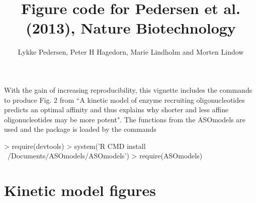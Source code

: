 \documentclass{article}
\title{Figure code for Pedersen et al. (2013), Nature Biotechnology}
\author{Lykke Pedersen, Peter H Hagedorn, Marie Lindholm and Morten Lindow}
\begin{document}



\maketitle
With the gain of increasing reproducibility, this vignette includes the commands to produce Fig. 2 from ``A kinetic model of enzyme recruiting oligonucleotides predicts an optimal affinity and thus explains why shorter and less affine oligonucleotides may be more potent". The functions from the ASOmodels are used and the package is loaded by the commands

\begin{Schunk}
\begin{Sinput}
> require(devtools)
> system('R CMD install ~/Documents/ASOmodels/ASOmodels')
> require(ASOmodels)
\end{Sinput}
\end{Schunk}

\section*{Kinetic model figures}
\end{document}
